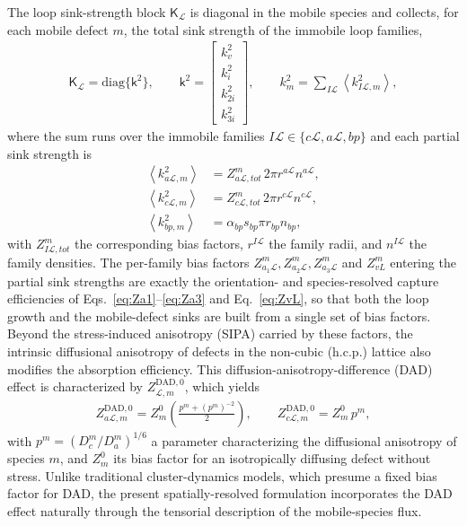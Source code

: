 \documentclass{article}
\newcommand{\spvec}[1]{\bm{\mathsf{#1}}}   %
\newcommand{\spmat}[1]{\bm{\mathsf{#1}}}   %
\begin{document}
The loop sink-strength block $\spmat{K}_{\mathcal L}$ is diagonal in the mobile species and collects, for each mobile defect $m$, the total sink strength of the immobile loop families,
\begin{align}\label{eq:KL_matrix}
\spmat{K}_{\mathcal L}=\mathrm{diag}\{\spvec{k}^2\},\qquad
\spvec{k}^2=\begin{bmatrix} k_v^2 \\ k_i^2 \\ k_{2i}^2 \\ k_{3i}^2 \end{bmatrix},\qquad
k_m^2=\sum_{I\mathcal{L}}\left\langle k^2_{I\mathcal{L},m}\right\rangle,
\end{align}
where the sum runs over the immobile families $I\mathcal{L}\in\{c\mathcal{L},a\mathcal{L},bp\}$ and each partial sink strength is
\begin{align}\label{eq:partial_sink}
\left\langle k^2_{a\mathcal{L},m }\right\rangle &= Z_{a\mathcal{L},tot}^m\, 2\pi r^{a\mathcal{L}} n^{a\mathcal{L}}, \\
\left\langle k^2_{c\mathcal{L},m }\right\rangle &= Z_{c\mathcal{L},tot}^m\, 2\pi r^{c\mathcal{L}} n^{c\mathcal{L}}, \\
\left\langle k^2_{bp,m }\right\rangle &= \alpha_{bp} s_{bp} \pi r_{bp} n_{bp},
\end{align}
with $Z_{I\mathcal{L},tot}^m$ the corresponding bias factors, $r^{I\mathcal{L}}$ the family radii, and $n^{I\mathcal{L}}$ the family densities. The per-family bias factors $Z^m_{a_1\mathcal L},Z^m_{a_2\mathcal L},Z^m_{a_3\mathcal L}$ and $Z^m_{vL}$ entering the partial sink strengths are exactly the orientation- and species-resolved capture efficiencies of Eqs.~\eqref{eq:Za1}--\eqref{eq:Za3} and Eq.~\eqref{eq:ZvL}, so that both the loop growth and the mobile-defect sinks are built from a single set of bias factors. Beyond the stress-induced anisotropy (SIPA) carried by these factors, the intrinsic diffusional anisotropy of defects in the non-cubic (h.c.p.) lattice also modifies the absorption efficiency. This diffusion-anisotropy-difference (DAD) effect is characterized by $Z^{\mathrm{DAD},0}_{\mathcal L,m}$, which yields
\begin{align}\label{eq:DAD0}
Z^{\mathrm{DAD},0}_{a\mathcal L,m} = Z^0_m\left(\frac{p^m+(p^m)^{-2}}{2}\right),\qquad
Z^{\mathrm{DAD},0}_{c\mathcal L,m} = Z^0_m\, p^m,
\end{align}
with $p^m=(D_c^m/D_a^m)^{1/6}$ a parameter characterizing the diffusional anisotropy of species $m$, and $Z^0_m$ its bias factor for an isotropically diffusing defect without stress. Unlike traditional cluster-dynamics models, which presume a fixed bias factor for DAD, the present spatially-resolved formulation incorporates the DAD effect naturally through the tensorial description of the mobile-species flux.
\end{document}
